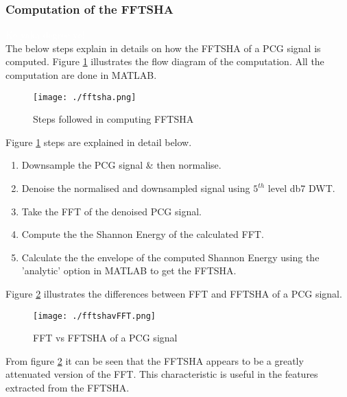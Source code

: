 \documentclass[10pt,twocolumn]{witseiepaper}
\begin{document}
\subsubsection{Computation of the FFTSHA}
\label{sec:fftsha}
\textcolor{white}{Ke yaka degree ye!}\\
The below steps explain in details on how the FFTSHA of a PCG signal is computed. Figure \ref{fig:fftsha} illustrates the flow diagram of the computation. All the computation are done in MATLAB.

\begin{figure}[h!]
    \centering
    \texttt{[image: ./fftsha.png]}
    \caption{Steps followed in computing FFTSHA}
    \label{fig:fftsha}
\end{figure}{}

Figure \ref{fig:fftsha} steps are explained in detail below.
\begin{enumerate}
    \item Downsample the PCG signal \& then normalise.
    \item Denoise the normalised and downsampled signal using $5^{th}$ level db7 DWT.
    \item Take the FFT of the denoised PCG signal.
    \item Compute the the Shannon Energy of the calculated FFT.
    \item Calculate the the envelope of the computed Shannon Energy using the 'analytic' option in MATLAB to get the FFTSHA.
\end{enumerate}{}

Figure \ref{fig:fftvsha} illustrates the differences between FFT and FFTSHA of a PCG signal.
\begin{figure}[h!]
    \centering
    \texttt{[image: ./fftshavFFT.png]}
    \caption{FFT vs FFTSHA of a PCG signal}
    \label{fig:fftvsha}
\end{figure}{}

From figure \ref{fig:fftvsha}  it can be seen that the FFTSHA appears to be a greatly attenuated version of the FFT. This characteristic is useful in the features extracted from the FFTSHA.
\end{document}
